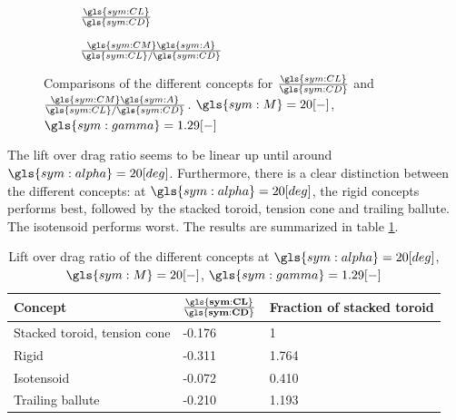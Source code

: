 \begin{figure}[h]
	\centering
	\begin{subfigure}{0.49\textwidth}
		\setlength{} 
		\setlength{}
		
		\caption{$\frac{\gls{sym:CL}}{\gls{sym:CD}}$}
		\label{fig:clcd}
	\end{subfigure}
	\begin{subfigure}{0.49\textwidth}
		\setlength{} 
		\setlength{}
			
		\caption{$\frac{\gls{sym:CM}\gls{sym:A}}{\gls{sym:CL}/\gls{sym:CD}}$}
		\label{fig:cmcl}
	\end{subfigure}
	\caption{Comparisons of the different concepts for $\frac{\gls{sym:CL}}{\gls{sym:CD}}$ and $\frac{\gls{sym:CM}\gls{sym:A}}{\gls{sym:CL}/\gls{sym:CD}}$. $\gls{sym:M}=20[-]$, $\gls{sym:gamma}=1.29[-]$}
	\label{fig:cmcl-clcd}
\end{figure}

The lift over drag ratio seems to be linear up until around $\gls{sym:alpha}=20 [deg]$. Furthermore, there is a clear distinction between the different concepts: at $\gls{sym:alpha}=20 [deg]$, the rigid concepts performs best, followed by the stacked toroid, tension cone and trailing ballute. The isotensoid performs worst. The results are summarized in table \ref{tab:clcd}.

\begin{table}[H]
	\caption{Lift over drag ratio of the different concepts at $\gls{sym:alpha}=20 [deg]$, $\gls{sym:M}=20[-]$, $\gls{sym:gamma}=1.29[-]$}%
	\label{tab:clcd}%
	\begin{tabular}{|p{}|p{}|p{}|}
		\hline
		\textbf{Concept}  				& \textbf{$\mathbf{\frac{\gls{sym:CL}}{\gls{sym:CD}}}$}	& \textbf{Fraction of stacked toroid}	\\ \hline \hline
		Stacked toroid, tension cone	& -0.176     				& 1								\\ \hline
		Rigid  							& -0.311					& 1.764						\\ \hline
		Isotensoid  					& -0.072					& 0.410						\\ \hline
		Trailing ballute				& -0.210					& 1.193						\\ \hline
	\end{tabular}
\end{table}

